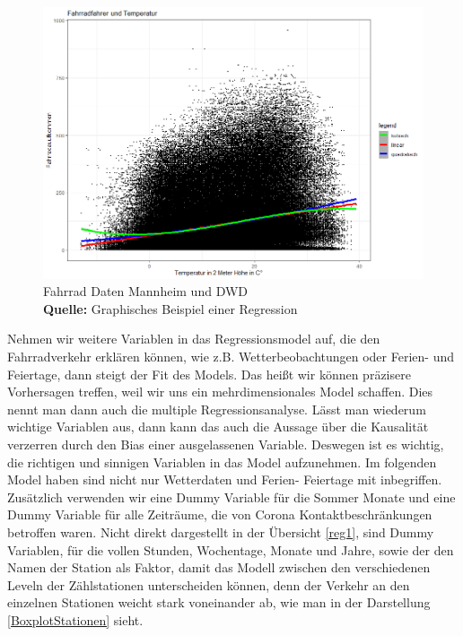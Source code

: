 \documentclass[a4paper,12pt]{thesis}
\newcommand*{\captionsource}[2]{%
	\caption[{#1}]{%
		#1%
		\\\hspace{\linewidth}%
		\textbf{Quelle:} #2%
	}%
}
\begin{document}
\begin{figure}[!ht]
	\centering
	\includegraphics[width=\textwidth]{Plots/Regression_Bsp.png}
	\captionsource{Fahrrad Daten Mannheim und DWD}{
		Graphisches Beispiel einer Regression
	}
	\label{fig:BSP}
\end{figure}

Nehmen wir weitere Variablen in das Regressionsmodel auf, die den Fahrradverkehr erklären können, wie z.B. Wetterbeobachtungen oder Ferien- und Feiertage, dann steigt der Fit des Models. Das heißt wir können präzisere Vorhersagen treffen, weil wir uns ein mehrdimensionales Model schaffen. Dies nennt man dann auch die multiple Regressionsanalyse. Lässt man wiederum wichtige Variablen aus, dann kann das auch die Aussage über die Kausalität verzerren durch den Bias einer ausgelassenen Variable. Deswegen ist es wichtig, die richtigen und sinnigen Variablen in das Model aufzunehmen. Im folgenden Model haben sind nicht nur Wetterdaten und Ferien- Feiertage mit inbegriffen. Zusätzlich verwenden wir eine Dummy Variable für die Sommer Monate und eine Dummy Variable für alle Zeiträume, die von Corona Kontaktbeschränkungen betroffen waren. Nicht direkt dargestellt in der Übersicht \ref{reg1}, sind Dummy Variablen, für die vollen Stunden, Wochentage, Monate und Jahre, sowie der den Namen der Station als Faktor, damit das Modell zwischen den verschiedenen Leveln der Zählstationen unterscheiden können, denn der Verkehr an den einzelnen Stationen weicht stark voneinander ab, wie man in der Darstellung \ref{BoxplotStationen} sieht.\\
\end{document}

